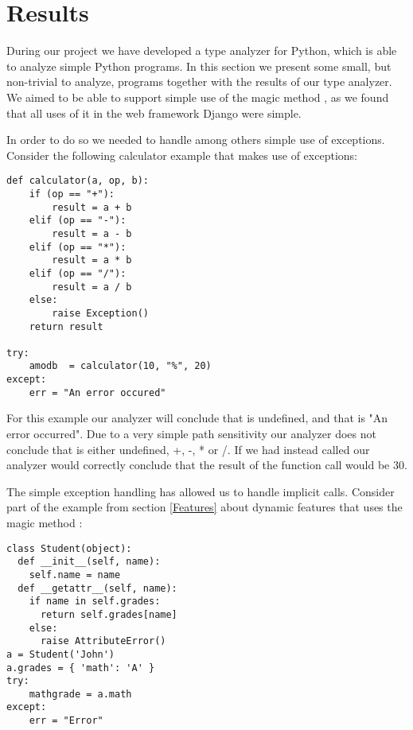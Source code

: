 \chapter{Results}
During our project we have developed a type analyzer for Python, which is able to analyze simple Python programs. In this section we present some small, but non-trivial to analyze, programs together with the results of our type analyzer. We aimed to be able to support simple use of the magic method , as we found that all uses of it in the web framework Django\cite{django} were simple.

In order to do so we needed to handle among others simple use of exceptions. Consider the following calculator example that makes use of exceptions:

\begin{listing}[H]
	\begin{verbatim}
def calculator(a, op, b):
	if (op == "+"):
		result = a + b
	elif (op == "-"):
		result = a - b
	elif (op == "*"):
		result = a * b
	elif (op == "/"):
		result = a / b
	else:
		raise Exception()
	return result

try:
	amodb  = calculator(10, "%", 20)
except:
	err = "An error occured"
	\end{verbatim}
\end{listing}

For this example our analyzer will conclude that  is undefined, and that  is "An error occurred". Due to a very simple path sensitivity our analyzer does not conclude that  is either undefined, +, -, * or /. If we had instead called  our analyzer would correctly conclude that the result of the function call would be 30.

The simple exception handling has allowed us to handle implicit  calls. Consider part of the  example from section \ref{Features} about dynamic features that uses the magic method :

\begin{listing}[H]
	\begin{verbatim}
class Student(object):
  def __init__(self, name):
    self.name = name
  def __getattr__(self, name):
    if name in self.grades:
      return self.grades[name]
    else:
      raise AttributeError()
a = Student('John')
a.grades = { 'math': 'A' }
try:
	mathgrade = a.math
except:
	err = "Error"
	\end{verbatim}
\end{listing}

